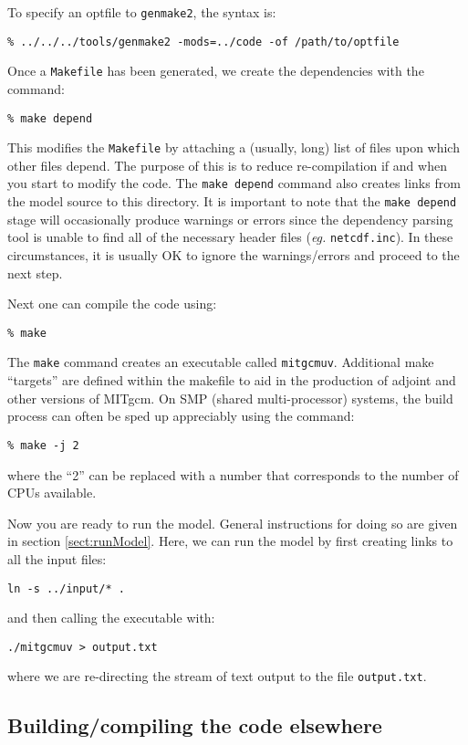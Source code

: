 To specify an optfile to \texttt{genmake2}, the syntax is:
\begin{verbatim}
% ../../../tools/genmake2 -mods=../code -of /path/to/optfile
\end{verbatim}

Once a \texttt{Makefile} has been generated, we create the
dependencies with the command:
\begin{verbatim}
% make depend
\end{verbatim}
This modifies the \texttt{Makefile} by attaching a (usually, long)
list of files upon which other files depend. The purpose of this is to
reduce re-compilation if and when you start to modify the code. The
{\tt make depend} command also creates links from the model source to
this directory.  It is important to note that the {\tt make depend}
stage will occasionally produce warnings or errors since the
dependency parsing tool is unable to find all of the necessary header
files (\textit{eg.}  \texttt{netcdf.inc}).  In these circumstances, it
is usually OK to ignore the warnings/errors and proceed to the next
step.

Next one can compile the code using:
\begin{verbatim}
% make
\end{verbatim}
The {\tt make} command creates an executable called \texttt{mitgcmuv}.
Additional make ``targets'' are defined within the makefile to aid in
the production of adjoint and other versions of MITgcm.  On SMP
(shared multi-processor) systems, the build process can often be sped
up appreciably using the command:
\begin{verbatim}
% make -j 2
\end{verbatim}
where the ``2'' can be replaced with a number that corresponds to the
number of CPUs available.

Now you are ready to run the model. General instructions for doing so are
given in section \ref{sect:runModel}. Here, we can run the model by
first creating links to all the input files:
\begin{verbatim}
ln -s ../input/* .
\end{verbatim}
and then calling the executable with:
\begin{verbatim}
./mitgcmuv > output.txt
\end{verbatim}
where we are re-directing the stream of text output to the file
\texttt{output.txt}.

\subsection{Building/compiling the code elsewhere}

